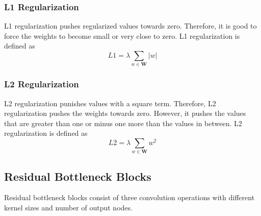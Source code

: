 \subsubsection{L1 Regularization}
L1 regularization pushes regularized values towards zero. Therefore, it is good to force the weights to become small or very close to zero. L1 regularization is defined as
$$ L1 = \lambda \sum_{w \in \mathbf{W}} |w| $$ 

\subsubsection{L2 Regularization}
L2 regularization punishes values with a square term. Therefore, L2 regularization pushes the weights towards zero. However, it pushes the values that are greater than one or minus one more than the values in between. L2 regularization is defined as
$$ L2 = \lambda \sum_{w \in \mathbf{W}} w^2 $$

\iffalse
\section{Efficient Structures}
Some structures help neural networks represent more information using less parameters. We are going to look at some structures that are known to work well with convolutional neural networks.

\subsection{Residual Blocks}
\cite{He:2015aa} introduced two types of residually connected blocks. The first is called a residual block, consisting of two convolution operations and a residual connection between the input and the output of the block. The second is called a residual bottleneck block, consisting of three convolution operations. First reducing number of channels with a one by one kernel, second applying a three by three kernel, third applying another one by one kernel to increase the number of dimensions. \cite{He:2015aa} have used residual blocks to train networks up to 34 layers. For networks having 50 or more layers, they have used the residual bottleneck block. Their 50-layer network using residual bottleneck blocks achieves $22.85\%$ top-1 error rate on ImageNet dataset while their 34-layer network is achieving $25.3\%$ top-1 error rate.
\fi
\iffalse
\subsection{Residual Bottleneck Blocks}
Residual bottleneck blocks consist of three convolution operations with different kernel sizes and number of output nodes. 

